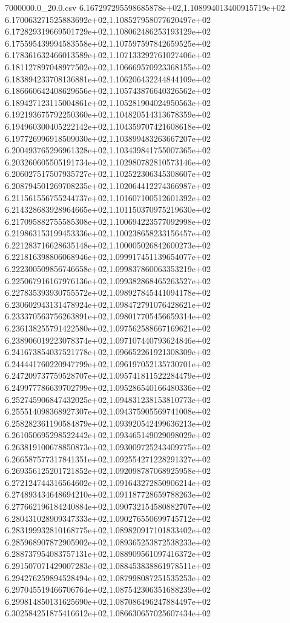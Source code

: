 \begin{filecontents*}{7000000.0_20.0.csv}
6.167297295598685878e+02,1.108994013400915719e+02
6.170063271525883692e+02,1.108527958077620497e+02
6.172829319669501729e+02,1.108062486253193129e+02
6.175595439994583558e+02,1.107597597842659525e+02
6.178361632466013589e+02,1.107133292761027406e+02
6.181127897048977502e+02,1.106669570923368155e+02
6.183894233708136881e+02,1.106206432244844109e+02
6.186660642408629656e+02,1.105743876640326562e+02
6.189427123115004861e+02,1.105281904024950563e+02
6.192193675792250360e+02,1.104820514313678359e+02
6.194960300405222142e+02,1.104359707421608618e+02
6.197726996918509030e+02,1.103899483263667207e+02
6.200493765296961328e+02,1.103439841755007365e+02
6.203260605505191734e+02,1.102980782810573146e+02
6.206027517507935727e+02,1.102522306345308607e+02
6.208794501269708235e+02,1.102064412274366987e+02
6.211561556755244737e+02,1.101607100512601392e+02
6.214328683928964665e+02,1.101150370975219630e+02
6.217095882755585308e+02,1.100694223577092998e+02
6.219863153199453336e+02,1.100238658233156457e+02
6.221283716628635148e+02,1.100005026842600273e+02
6.221816398806068946e+02,1.099917451139654077e+02
6.222300509856746658e+02,1.099837860063353219e+02
6.225067916167976136e+02,1.099382868465263527e+02
6.227835393930755572e+02,1.098927845441094178e+02
6.230602943131478924e+02,1.098472791076428621e+02
6.233370563756263891e+02,1.098017705456659314e+02
6.236138255791422580e+02,1.097562588667169621e+02
6.238906019223078374e+02,1.097107440793624846e+02
6.241673854037521778e+02,1.096652261921308309e+02
6.244441760220947799e+02,1.096197052135730701e+02
6.247209737759528707e+02,1.095741811522284479e+02
6.249977786639702799e+02,1.095286540166480336e+02
6.252745906847432025e+02,1.094831238153810773e+02
6.255514098368927307e+02,1.094375905569741008e+02
6.258282361190584879e+02,1.093920542499636213e+02
6.261050695298522442e+02,1.093465149029098029e+02
6.263819100678850873e+02,1.093009725243409775e+02
6.266587577317841351e+02,1.092554271228291327e+02
6.269356125201721852e+02,1.092098787068925958e+02
6.272124744316564602e+02,1.091643272850906214e+02
6.274893434648694210e+02,1.091187728659788263e+02
6.277662196184240884e+02,1.090732154580882707e+02
6.280431028909347333e+02,1.090276550699745712e+02
6.283199932810168775e+02,1.089820917101833402e+02
6.285968907872905902e+02,1.089365253872538233e+02
6.288737954083757131e+02,1.088909561097416372e+02
6.291507071429007283e+02,1.088453838861978511e+02
6.294276259894528494e+02,1.087998087251535253e+02
6.297045519466706764e+02,1.087542306351688239e+02
6.299814850131625690e+02,1.087086496247884497e+02
6.302584251875416612e+02,1.086630657025607434e+02

\end{filecontents*}
